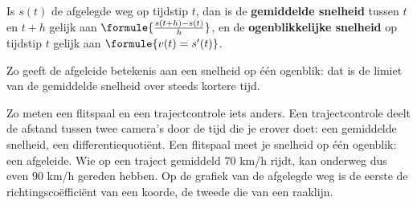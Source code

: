 \begin{theorie}
Is $s(t)$ de afgelegde weg op tijdstip $t$, dan is de \textbf{\textcolor{accent}{gemiddelde snelheid}} tussen $t$ en $t + h$ gelijk aan $\formule{\frac{s(t + h) - s(t)}{h}}$, en de \textbf{\textcolor{accent}{ogenblikkelijke snelheid}} op tijdstip $t$ gelijk aan $\formule{v(t) = s'(t)}$.
\end{theorie}

Zo geeft de afgeleide betekenis aan een snelheid op één ogenblik: dat is de limiet van de gemiddelde snelheid over steeds kortere tijd.

Zo meten een flitspaal en een trajectcontrole iets anders. Een trajectcontrole deelt de afstand tussen twee camera's door de tijd die je erover doet: een gemiddelde snelheid, een differentiequotiënt. Een flitspaal meet je snelheid op één ogenblik: een afgeleide. Wie op een traject gemiddeld $70$ km/h rijdt, kan onderweg dus even $90$ km/h gereden hebben. Op de grafiek van de afgelegde weg is de eerste de richtingscoëfficiënt van een koorde, de tweede die van een raaklijn.


\begin{oefeningen}
\end{oefeningen}

